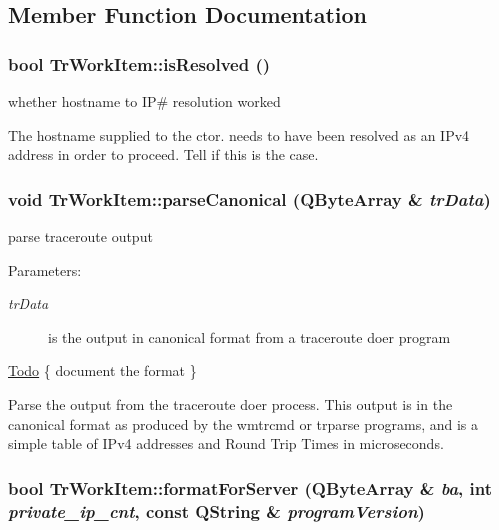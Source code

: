 \subsection{Member Function Documentation}
\hypertarget{classTrWorkItem_e95da0459466fe9c4cd30384e75dfc1c}{
\subsubsection[isResolved]{\setlength{\rightskip}{0pt plus 5cm}bool TrWorkItem::isResolved ()}}
\label{classTrWorkItem_e95da0459466fe9c4cd30384e75dfc1c}


whether hostname to IP\# resolution worked 

The hostname supplied to the ctor. needs to have been resolved as an IPv4 address in order to proceed. Tell if this is the case. \hypertarget{classTrWorkItem_9410f63d30b40f24b452243f1f5f0a48}{
\subsubsection[parseCanonical]{\setlength{\rightskip}{0pt plus 5cm}void TrWorkItem::parseCanonical (QByteArray \& {\em trData})}}
\label{classTrWorkItem_9410f63d30b40f24b452243f1f5f0a48}


parse traceroute output \begin{Desc}
\item[Parameters:]
\begin{description}
\item[{\em trData}]is the output in canonical format from a traceroute doer program \end{description}
\end{Desc}
\begin{Desc}
\item[\hyperlink{todo__todo000005}{Todo}]\{ document the format \} \end{Desc}
Parse the output from the traceroute doer process. This output is in the canonical format as produced by the wmtrcmd or trparse programs, and is a simple table of IPv4 addresses and Round Trip Times in microseconds. \hypertarget{classTrWorkItem_5e3ff6cc58c4411661b93e4280613b43}{
\subsubsection[formatForServer]{\setlength{\rightskip}{0pt plus 5cm}bool TrWorkItem::formatForServer (QByteArray \& {\em ba}, \/  int {\em private\_\-ip\_\-cnt}, \/  const QString \& {\em programVersion})}}
\label{classTrWorkItem_5e3ff6cc58c4411661b93e4280613b43}


